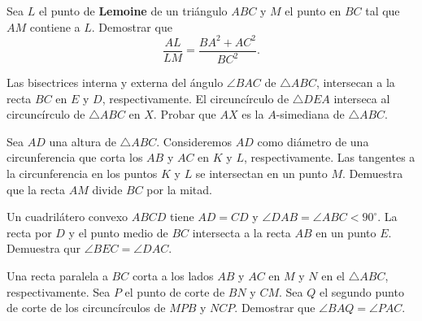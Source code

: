 \begin{section-problem}
    Sea $L$ el punto de \textbf{Lemoine} de un triángulo $ABC$ y $M$ el punto en $BC$ tal que $AM$ contiene a $L$.
    Demostrar que
    \[
        \frac{AL}{LM} = \frac{BA^2 + AC^2}{BC^2}.
    \]
\end{section-problem}

\begin{section-problem}
    Las bisectrices interna y externa del ángulo $\angle BAC$ de $\triangle ABC$, intersecan a la recta $BC$ en $E$ y $D$, respectivamente.
    El circuncírculo de $\triangle DEA$ interseca al circuncírculo de $\triangle ABC$ en $X$.
    Probar que $AX$ es la $A$-simediana de $\triangle ABC$.
\end{section-problem}

\begin{section-problem}
    Sea $AD$ una altura de $\triangle ABC$.
    Consideremos $AD$ como diámetro de una circunferencia que corta los $AB$ y $AC$ en $K$ y $L$, respectivamente.
    Las tangentes a la circunferencia en los puntos $K$ y $L$ se intersectan en un punto $M$.
    Demuestra que la recta $AM$ divide $BC$ por la mitad.
\end{section-problem}

\begin{section-problem}
    Un cuadrilátero convexo $ABCD$ tiene $AD = CD$ y $\angle DAB = \angle ABC < 90^\circ$.
    La recta por $D$ y el punto medio de $BC$ intersecta a la recta $AB$ en un punto $E$.
    Demuestra qur $\angle BEC = \angle DAC$.
\end{section-problem}

\begin{section-problem}
    Una recta paralela a $BC$ corta a los lados $AB$ y $AC$ en $M$ y $N$ en el $\triangle ABC$, respectivamente.
    Sea $P$ el punto de corte de $BN$ y $CM$.
    Sea $Q$ el segundo punto de corte de los circuncírculos de $MPB$ y $NCP$.
    Demostrar que $\angle BAQ = \angle PAC$.
\end{section-problem}